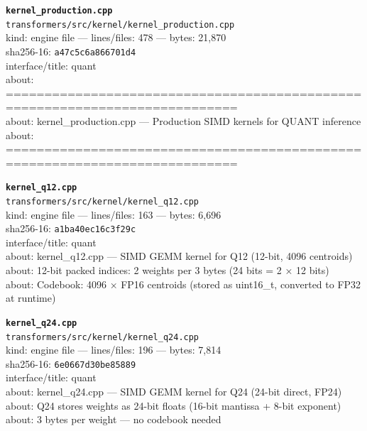 \noindent\textbf{\texttt{kernel\_production.cpp}}\\
\texttt{transformers/src/kernel/kernel\_production.cpp}\\
kind: engine file --- lines/files: 478 --- bytes: 21,870\\
sha256-16: \texttt{a47c5c6a866701d4}\\
interface/title: quant\\
about: ============================================================================\\
about: kernel\_production.cpp — Production SIMD kernels for QUANT inference\\
about: ============================================================================\\
\vspace*{6.0pt}

\noindent\textbf{\texttt{kernel\_q12.cpp}}\\
\texttt{transformers/src/kernel/kernel\_q12.cpp}\\
kind: engine file --- lines/files: 163 --- bytes: 6,696\\
sha256-16: \texttt{a1ba40ec16c3f29c}\\
interface/title: quant\\
about: kernel\_q12.cpp — SIMD GEMM kernel for Q12 (12-bit, 4096 centroids)\\
about: 12-bit packed indices: 2 weights per 3 bytes (24 bits = 2 × 12 bits)\\
about: Codebook: 4096 × FP16 centroids (stored as uint16\_t, converted to FP32 at runtime)\\
\vspace*{6.0pt}
\newpage

\noindent\textbf{\texttt{kernel\_q24.cpp}}\\
\texttt{transformers/src/kernel/kernel\_q24.cpp}\\
kind: engine file --- lines/files: 196 --- bytes: 7,814\\
sha256-16: \texttt{6e0667d30be85889}\\
interface/title: quant\\
about: kernel\_q24.cpp — SIMD GEMM kernel for Q24 (24-bit direct, FP24)\\
about: Q24 stores weights as 24-bit floats (16-bit mantissa + 8-bit exponent)\\
about: 3 bytes per weight — no codebook needed\\
\vspace*{6.0pt}

